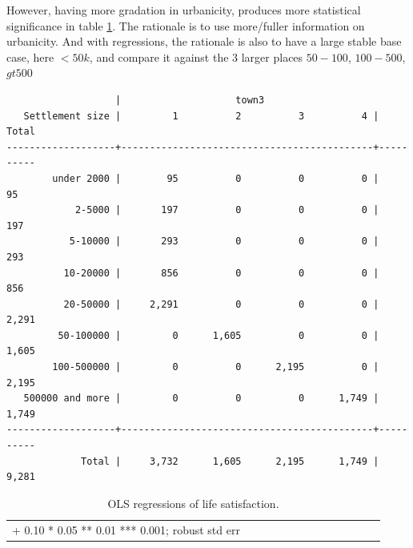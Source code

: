\documentclass[10pt, letterpaper]{article}
\begin{document}
\begin{spacing}{1.4}
However, having more gradation in urbanicity, produces more statistical 
significance in table \ref{regX}. The rationale is to use more/fuller information on
urbanicity. And with regressions, the rationale is also to have a large stable base case, here
$<50k$, and compare it against the 3 larger places $50-100$, $100-500$, $gt500$ 

\begin{scriptsize}
\begin{spacing}{.85}
\begin{verbatim}
                   |                    town3
   Settlement size |         1          2          3          4 |     Total
-------------------+--------------------------------------------+----------
        under 2000 |        95          0          0          0 |        95 
            2-5000 |       197          0          0          0 |       197 
           5-10000 |       293          0          0          0 |       293 
          10-20000 |       856          0          0          0 |       856 
          20-50000 |     2,291          0          0          0 |     2,291 
         50-100000 |         0      1,605          0          0 |     1,605 
        100-500000 |         0          0      2,195          0 |     2,195 
   500000 and more |         0          0          0      1,749 |     1,749 
-------------------+--------------------------------------------+----------
             Total |     3,732      1,605      2,195      1,749 |     9,281 
\end{verbatim}
\end{spacing}
\end{scriptsize}


\begin{spacing}{.9} \begin{table}[H]\centering   \begin{scriptsize} \begin{tabular}{p{1.6in}p{.45in}p{.45in}p{.45in}|p{.45in}p{.45in}p{.45in}|p{.45in}p{.45in}p{.45in}p{.5 in}p{.45in}p{.5 in}}\\  \hline + 0.10 * 0.05 ** 0.01 *** 0.001; robust std err \end{tabular}\end{scriptsize}\caption{\label{regX}OLS regressions of life satisfaction.}\end{table} \end{spacing}

%


\end{spacing}
\end{document}
